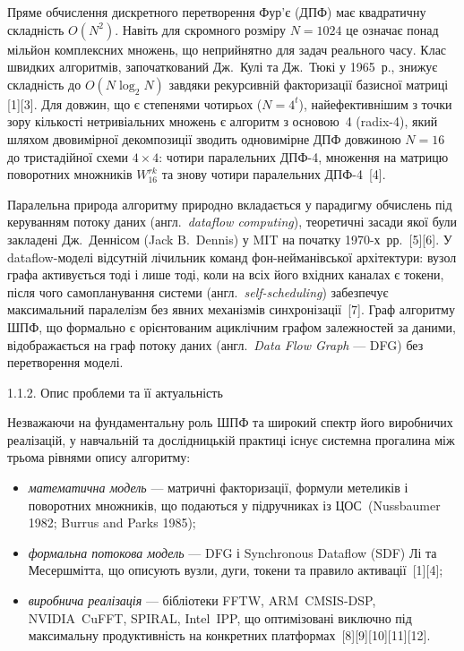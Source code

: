 Пряме обчислення дискретного перетворення Фур'є (ДПФ) має квадратичну
складність \(O(N^{2})\). Навіть для скромного розміру \(N = 1024\) це
означає понад мільйон комплексних множень, що неприйнятно для задач
реального часу. Клас швидких алгоритмів, започаткований Дж.~Кулі та
Дж.~Тюкі у 1965~р., знижує складність до \(O(N\log_{2}N)\) завдяки
рекурсивній факторизації базисної матриці {[}1{]}{[}3{]}. Для довжин, що
є степенями чотирьох (\(N = 4^{t}\)), найефективнішим з точки зору
кількості нетривіальних множень є алгоритм з основою~4 (radix-4), який
шляхом двовимірної декомпозиції зводить одновимірне ДПФ довжиною
\(N = 16\) до тристадійної схеми \(4 \times 4\): чотири паралельних
ДПФ-4, множення на матрицю поворотних множників \(W_{16}^{rk}\) та знову
чотири паралельних ДПФ-4~{[}4{]}.

Паралельна природа алгоритму природно вкладається у парадигму обчислень
під керуванням потоку даних (англ.~\emph{dataflow computing}),
теоретичні засади якої були закладені Дж.~Деннісом (Jack B.~Dennis) у
MIT на початку 1970-х~рр.~{[}5{]}{[}6{]}. У dataflow-моделі відсутній
лічильник команд фон-нейманівської архітектури: вузол графа активується
тоді і лише тоді, коли на всіх його вхідних каналах є токени, після чого
самопланування системи (англ.~\emph{self-scheduling}) забезпечує
максимальний паралелізм без явних механізмів синхронізації~{[}7{]}. Граф
алгоритму ШПФ, що формально є орієнтованим ациклічним графом залежностей
за даними, відображається на граф потоку даних (англ.~\emph{Data Flow
Graph} --- DFG) без перетворення моделі.

1.1.2. Опис проблеми та її актуальність

Незважаючи на фундаментальну роль ШПФ та широкий спектр його виробничих
реалізацій, у навчальній та дослідницькій практиці існує системна
прогалина між трьома рівнями опису алгоритму:

\begin{itemize}
\item
  \emph{математична модель} --- матричні факторизації, формули метеликів
  і поворотних множників, що подаються у підручниках із ЦОС~(Nussbaumer
  1982; Burrus and Parks 1985);
\item
  \emph{формальна потокова модель} --- DFG і Synchronous Dataflow (SDF)
  Лі та Месершмітта, що описують вузли, дуги, токени та правило
  активації~{[}1{]}{[}4{]};
\item
  \emph{виробнича реалізація} --- бібліотеки FFTW, ARM~CMSIS-DSP,
  NVIDIA~CuFFT, SPIRAL, Intel~IPP, що оптимізовані виключно під
  максимальну продуктивність на конкретних
  платформах~{[}8{]}{[}9{]}{[}10{]}{[}11{]}{[}12{]}.
\end{itemize}

